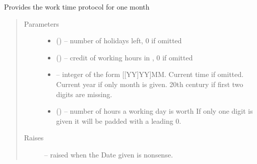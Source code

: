 \documentclass[letterpaper,10pt,english]{sphinxmanual}
\begin{document}
\begin{fulllineitems}
\label{\detokenize{devmanual:protocol.Month}}
Provides the work time protocol for one month
\begin{quote}\begin{description}
\item[{Parameters}] \leavevmode\begin{itemize}
\item {} 
 () -- number of holidays left, 0 if omitted

\item {} 
 () -- credit of working hours in , 0 if omitted

\item {} 
 -- integer of the form {[}{[}YY{]}YY{]}MM. Current time if omitted. Current year if only month is given. 20th century if first two digits are missing.

\item {} 
 () -- number of hours a working day is worth
If only one digit is given it will be padded with a leading 0.

\end{itemize}

\item[{Raises}] \leavevmode
{\hyperref[\detokenize{devmanual:protocol.InvalidDateException}]{}} -- raised when the Date given is nonsense.

\end{description}\end{quote}


\end{fulllineitems}
\end{document}
